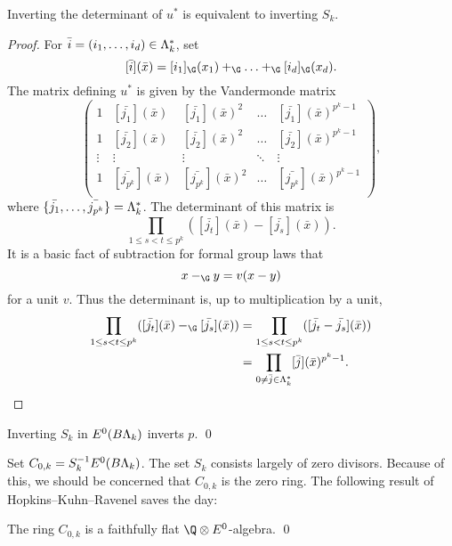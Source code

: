 \begin{lemma} \label{det}
Inverting the determinant of \(u^*\) is equivalent to inverting \(S_k\).
\end{lemma}
\begin{proof}
For \(\bar{i} = (i_1, \ldots, i_d) \in \Lambda_k^*\), set
\[
[\bar{i}](\bar{x}) = [i_1]_{\G}(x_1) +_{\G} \ldots +_{\G} [i_d]_{\G}(x_d).
\]
The matrix defining \(u^*\) is given by the Vandermonde matrix
\[
\left(
\begin{array}{ccccc}
1 & [\bar{j_1}](\bar{x}) & [\bar{j_1}](\bar{x})^2 & \ldots & [\bar{j_{1}}](\bar{x})^{p^k-1} \\
1 & [\bar{j_2}](\bar{x}) & [\bar{j_2}](\bar{x})^2 & \ldots & [\bar{j_{2}}](\bar{x})^{p^k-1}\\
\vdots & \vdots & \vdots & \ddots & \vdots \\
1 & [\bar{j_{p^k}}](\bar{x}) & [\bar{j_{p^k}}](\bar{x})^2 & \ldots & [\bar{j_{p^k}}](\bar{x})^{p^k-1}\\
\end{array} \right),
\]
where \(\{\bar{j_1},\ldots,\bar{j_{p^k}}\} = \Lambda_k^*\).
The determinant of this matrix is
\[
\prod_{1 \leq s < t \leq p^k} ([\bar{j_t}](\bar{x}) - [\bar{j_s}](\bar{x})).
\]
It is a basic fact of subtraction for formal group laws that
\[
x -_{\G} y = v(x-y)
\]
for a unit \(v\). 
Thus the determinant is, up to multiplication by a unit, 
\begin{align*}
\prod_{1 \leq s < t \leq p^k} ([\bar{j_t}](\bar{x}) -_{\G} [\bar{j_s}](\bar{x})) & = \prod_{1 \leq s < t \leq p^k} ([\bar{j_t} - \bar{j_s}](\bar{x})) \\
& = \prod_{0 \neq \bar{j} \in \Lk^*} [\bar{j}](\bar{x})^{p^k-1}. \qedhere
\end{align*} 
\end{proof}

\begin{corollary}
Inverting \(S_k\) in \(E^0(B\Lambda_k)\) inverts \(p\). \pushQED\qed \qedhere \popQED
\end{corollary}

Set \(C_{0,k} = S_{k}^{-1}E^0(B\Lambda_k)\).  The set \(S_k\) consists largely of zero divisors. Because of this, we should be concerned that \(C_{0,k}\) is the zero ring. The following result of Hopkins--Kuhn--Ravenel saves the day:

\begin{proposition}\label{CZeroIsFaithfullyFlat}
The ring \(C_{0,k}\) is a faithfully flat \(\Q \otimes E^0\)-algebra. \pushQED\qed \qedhere \popQED
\end{proposition}

